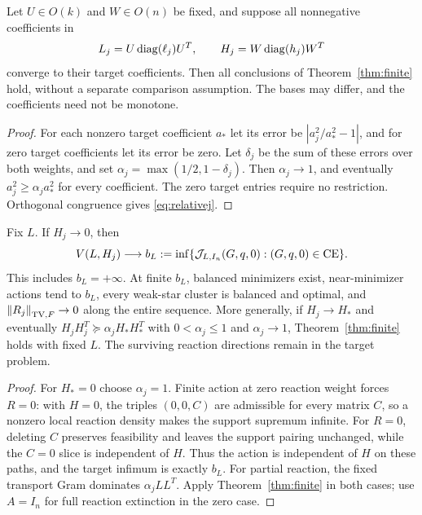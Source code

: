 \begin{corollary}\label{cor:bases}
Let $U\in O(k)$ and $W\in O(n)$ be fixed, and suppose all nonnegative
coefficients in
\[
 L_j=U\operatorname{diag}(\ell_j)U^T,\qquad H_j=W\operatorname{diag}(h_j)W^T
\]
converge to their target coefficients. Then all conclusions of
Theorem~\ref{thm:finite} hold, without a separate comparison assumption.
The bases may differ, and the coefficients need not be monotone.
\end{corollary}
\begin{proof}
For each nonzero target coefficient $a_*$ let its error be
$|a_j^2/a_*^2-1|$, and for zero target coefficients let its error be zero.
Let $\delta_j$ be the sum of these errors over both weights, and set
$\alpha_j=\max(1/2,1-\delta_j)$. Then $\alpha_j\to1$, and eventually
$a_j^2\ge\alpha_ja_*^2$ for every coefficient. The zero target entries
require no restriction. Orthogonal congruence gives \eqref{eq:relativej}.
\end{proof}

\begin{corollary}\label{cor:reaction}
Fix $L$. If $H_j\to0$, then
\[
 V(L,H_j)\longrightarrow
 b_L:=\inf\{\mathcal J_{L,I_n}(G,q,0):(G,q,0)\in\operatorname{CE}\}.
\]
This includes $b_L=+\infty$. At finite $b_L$, balanced minimizers exist,
near-minimizer actions tend to $b_L$, every weak-star cluster is balanced
and optimal, and $\left\lVert R_j\right\rVert_{\operatorname{TV},F}\to0$ along the entire sequence.
More generally, if $H_j\to H_*$ and eventually
$H_jH_j^T\succeq\alpha_jH_*H_*^T$ with $0<\alpha_j\le1$ and
$\alpha_j\to1$, Theorem~\ref{thm:finite} holds with fixed $L$.
The surviving reaction directions remain in the target problem.
\end{corollary}
\begin{proof}
For $H_*=0$ choose $\alpha_j=1$. Finite action at zero reaction weight
forces $R=0$: with $H=0$, the triples $(0,0,C)$ are admissible for every
matrix $C$, so a nonzero local reaction density makes the support supremum
infinite. For $R=0$, deleting $C$ preserves feasibility and
leaves the support pairing unchanged, while the $C=0$ slice is independent
of $H$. Thus the action is independent of $H$ on these paths, and the target
infimum is exactly $b_L$.
For partial reaction, the fixed transport Gram dominates
$\alpha_jLL^T$. Apply Theorem~\ref{thm:finite} in both cases; use $A=I_n$
for full reaction extinction in the zero case.
\end{proof}

